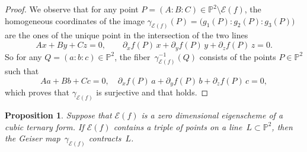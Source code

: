 \documentclass{amsart}
\theoremstyle{plain}
\newtheorem{prop}[lemma]{Proposition}
\theoremstyle{definition}
\newcommand{\p}{\mathbb{P}}
\newcommand{\Bl}{\mathrm{Bl}}
\newcommand{\Eig}[1]{\mathcal{E}\!\left( {#1} \right)}
\begin{document}
\begin{proof}
We observe that for any point $P=(A:B:C) \in \p^2 \setminus \Eig{f}$, the homogeneous coordinates
of the image $\gamma_{\Eig{f}}(P) = \bigl( g_1(P): g_2(P): g_3(P) \bigr)$ are the ones of the unique point in the intersection of the two lines
%
\[
  Ax + By+ Cz = 0, \qquad
  \partial_x f(P) \, x + \partial_y f(P) \, y + \partial_z f(P) \, z = 0.
\]
%
So for any $Q = (a:b:c) \in \p^2$, the fiber~$\gamma_{\Eig{f}}^{-1}(Q)$ consists of the points $P \in \p^2$ such that
%
\begin{equation}
\label{eq:polars}
  Aa + Bb+ Cc = 0, \quad
  \partial_x f(P) \, a + \partial_y f(P) \, b + \partial_z f(P) \, c = 0,
\end{equation}
%
which proves that $\gamma_{\Eig{f}}$ is surjective and that  holds.
\end{proof}

\begin{prop}
\label{prop:allineati_contrae}
Suppose that $\Eig{f}$ is a zero dimensional eigenscheme of a cubic ternary form.
If $\Eig{f}$ contains a triple of points on a line~$L \subset \p^2$, then the Geiser map~$\gamma_{\Eig{f}}$ contracts~$L$.
\end{prop}
\end{document}
